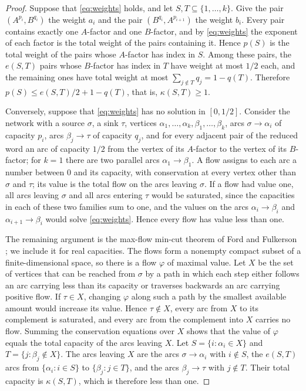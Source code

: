 \documentclass{amsart}
\theoremstyle{definition}
\theoremstyle{remark}
\numberwithin{equation}{section}
\newcommand{\cut}{\kappa}
\begin{document}
\begin{proof}
Suppose that \eqref{eq:weights} holds, and let $S,T\subseteq\{1,\dots,k\}$. Give the pair $(A^{p_i},B^{q_i})$ the weight $a_i$ and the pair $(B^{q_i},A^{p_{i+1}})$ the weight $b_i$. Every pair contains exactly one $A$-factor and one $B$-factor, and by \eqref{eq:weights} the exponent of each factor is the total weight of the pairs containing it. Hence $p(S)$ is the total weight of the pairs whose $A$-factor has index in $S$. Among these pairs, the $e(S,T)$ pairs whose $B$-factor has index in $T$ have weight at most $1/2$ each, and the remaining ones have total weight at most $\sum_{j\notin T}q_j=1-q(T)$. Therefore $p(S)\le e(S,T)/2+1-q(T)$, that is, $\cut(S,T)\ge 1$.

Conversely, suppose that \eqref{eq:weights} has no solution in $[0,1/2]$. Consider the network with a source $\sigma$, a sink $\tau$, vertices $\alpha_1,\dots,\alpha_k,\beta_1,\dots,\beta_k$, arcs $\sigma\to\alpha_i$ of capacity $p_i$, arcs $\beta_j\to\tau$ of capacity $q_j$, and for every adjacent pair of the reduced word an arc of capacity $1/2$ from the vertex of its $A$-factor to the vertex of its $B$-factor; for $k=1$ there are two parallel arcs $\alpha_1\to\beta_1$. A flow assigns to each arc a number between $0$ and its capacity, with conservation at every vertex other than $\sigma$ and $\tau$; its value is the total flow on the arcs leaving $\sigma$. If a flow had value one, all arcs leaving $\sigma$ and all arcs entering $\tau$ would be saturated, since the capacities in each of these two families sum to one, and the values on the arcs $\alpha_i\to\beta_i$ and $\alpha_{i+1}\to\beta_i$ would solve \eqref{eq:weights}. Hence every flow has value less than one.

The remaining argument is the max-flow min-cut theorem of Ford and Fulkerson \cite{FF}; we include it for real capacities. The flows form a nonempty compact subset of a finite-dimensional space, so there is a flow $\varphi$ of maximal value. Let $X$ be the set of vertices that can be reached from $\sigma$ by a path in which each step either follows an arc carrying less than its capacity or traverses backwards an arc carrying positive flow. If $\tau\in X$, changing $\varphi$ along such a path by the smallest available amount would increase its value. Hence $\tau\notin X$, every arc from $X$ to its complement is saturated, and every arc from the complement into $X$ carries no flow. Summing the conservation equations over $X$ shows that the value of $\varphi$ equals the total capacity of the arcs leaving $X$. Let $S=\{i:\alpha_i\in X\}$ and $T=\{j:\beta_j\notin X\}$. The arcs leaving $X$ are the arcs $\sigma\to\alpha_i$ with $i\notin S$, the $e(S,T)$ arcs from $\{\alpha_i:i\in S\}$ to $\{\beta_j:j\in T\}$, and the arcs $\beta_j\to\tau$ with $j\notin T$. Their total capacity is $\cut(S,T)$, which is therefore less than one.
\end{proof}
\end{document}
